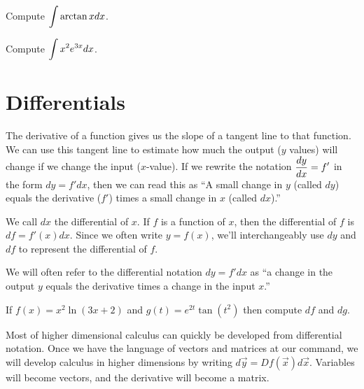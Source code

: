 \begin{problem}
Compute $\displaystyle \int \arctan x dx$.
\end{problem}

\begin{problem}
Compute $\displaystyle \int x^2 e^{3x} dx$.
\end{problem}


\newpage

\section{Differentials}
The derivative of a function gives us the slope of a tangent line to that function. We can use this tangent line to estimate how much the output ($y$ values) will change if we change the input ($x$-value). If we rewrite the notation $\displaystyle\frac{dy}{dx}=f'$ in the form $dy=f' dx$, then we can read this as ``A small change in $y$ (called $dy$) equals the derivative ($f'$) times a small change in $x$ (called $dx$).'' 

\begin{definition}
We call $dx$ the differential of $x$.  If $f$ is a function of $x$, then the differential of $f$ is $df = f'(x) dx$. Since we often write $y=f(x)$, we'll interchangeably use $dy$ and $df$ to represent the differential of $f$. 

We will often refer to the differential notation $dy=f'dx$ as ``a change in the output $y$ equals the derivative times a change in the input $x$.'' 
\end{definition}

\begin{problem}
If $f(x) = x^2\ln(3x+2)$ and $g(t) = e^{2t}\tan(t^2)$ then compute $df$ and $dg$.  
\end{problem}

Most of higher dimensional calculus can quickly be developed from differential notation. Once we have the language of vectors and matrices at our command, we will develop calculus in higher dimensions by writing $d\vec y = Df(\vec x) d\vec x$.  Variables will become vectors, and the derivative will become a matrix.
 
